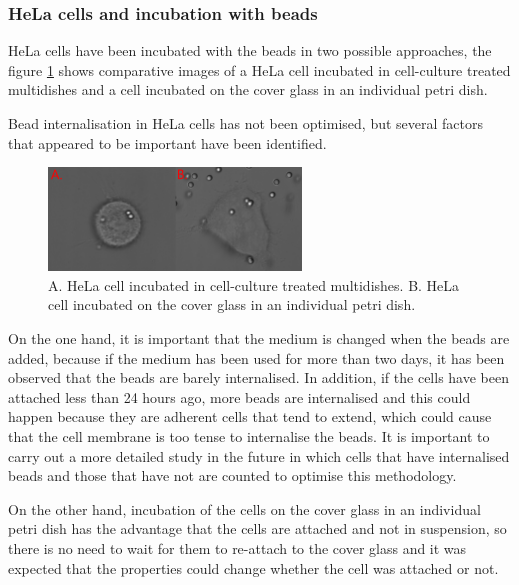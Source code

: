 \documentclass[12pt, a4paper]{article} %
\begin{document}
\setlength{\parskip}{0mm}

\subsubsection{HeLa cells and incubation with beads}

HeLa cells have been incubated with the beads in two possible approaches, the figure \ref{fig:hela_cell_shape} shows comparative images of a HeLa cell incubated in cell-culture treated multidishes and a cell incubated on the cover glass in an individual petri dish.

\setlength{\parskip}{4mm}

Bead internalisation in HeLa cells has not been optimised, but several factors that appeared to be important have been identified.
\newpage
\begin{figure}[htbp]
	\centering
	\includegraphics[width=0.60\textwidth]{figures/hela_cell_shape.png}
	\caption{A. HeLa cell incubated in cell-culture treated multidishes. B. HeLa cell incubated on the cover glass in an individual petri dish.}
	\label{fig:hela_cell_shape} 
\end{figure}
 On the one hand, it is important that the medium is changed when the beads are added, because if the medium has been used for more than two days, it has been observed that the beads are barely internalised. In addition, if the cells have been attached less than 24 hours ago, more beads are internalised and this could happen because they are adherent cells that tend to extend, which could cause that the cell membrane is too tense to internalise the beads. It is important to carry out a more detailed study in the future in which cells that have internalised beads and those that have not are counted to optimise this methodology.

On the other hand, incubation of the cells on the cover glass in an individual petri dish has the advantage that the cells are attached and not in suspension, so there is no need to wait for them to re-attach to the cover glass and it was expected that the properties could change whether the cell was attached or not.
\end{document}
